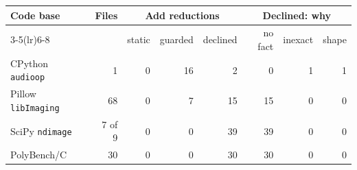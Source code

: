 \begin{tabular}{lrrrrrrr}
\toprule
Code base & Files & \multicolumn{3}{c}{Add reductions} & \multicolumn{3}{c}{Declined: why}\\
\cmidrule(lr){3-5}\cmidrule(lr){6-8}
 & & static & guarded & declined & no fact & inexact & shape\\
\midrule
CPython \texttt{audioop} & 1 & 0 & 16 & 2 & 0 & 1 & 1\\
Pillow \texttt{libImaging} & 68 & 0 & 7 & 15 & 15 & 0 & 0\\
SciPy \texttt{ndimage} & 7 of 9 & 0 & 0 & 39 & 39 & 0 & 0\\
PolyBench/C & 30 & 0 & 0 & 30 & 30 & 0 & 0\\
\bottomrule
\end{tabular}
